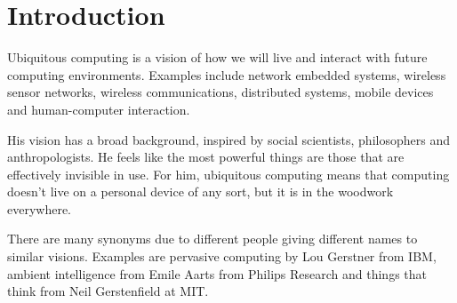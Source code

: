\section{Introduction}
\begin{mytitle} Ubiquitous computing is a vision of how we will live and interact with future computing environments. Examples include network embedded systems, wireless sensor networks, wireless communications, distributed systems, mobile devices and human-computer interaction.
\end{mytitle}
\begin{mytitle} His vision has a broad background, inspired by social scientists, philosophers and anthropologists. He feels like the most powerful things are those that are effectively invisible in use. For him, ubiquitous computing means that computing doesn't live on a personal device of any sort, but it is in the woodwork everywhere. 
\end{mytitle}
\begin{mytitle} There are many synonyms due to different people giving different names to similar visions. Examples are pervasive computing by Lou Gerstner from IBM, ambient intelligence from Emile Aarts from Philips Research and things that think from Neil Gerstenfield at MIT.
\end{mytitle}